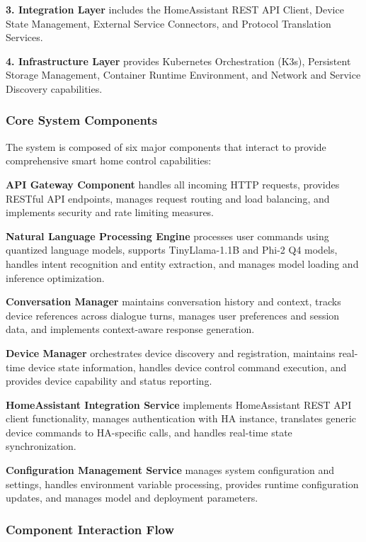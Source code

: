 \documentclass[12pt]{article}
\begin{document}
\textbf{3. Integration Layer} includes the HomeAssistant REST API Client, Device State Management, External Service Connectors, and Protocol Translation Services.

\textbf{4. Infrastructure Layer} provides Kubernetes Orchestration (K3s), Persistent Storage Management, Container Runtime Environment, and Network and Service Discovery capabilities.

\subsubsection{Core System Components}

The system is composed of six major components that interact to provide comprehensive smart home control capabilities:

\textbf{API Gateway Component} handles all incoming HTTP requests, provides RESTful API endpoints, manages request routing and load balancing, and implements security and rate limiting measures.

\textbf{Natural Language Processing Engine} processes user commands using quantized language models, supports TinyLlama-1.1B and Phi-2 Q4 models, handles intent recognition and entity extraction, and manages model loading and inference optimization.

\textbf{Conversation Manager} maintains conversation history and context, tracks device references across dialogue turns, manages user preferences and session data, and implements context-aware response generation.

\textbf{Device Manager} orchestrates device discovery and registration, maintains real-time device state information, handles device control command execution, and provides device capability and status reporting.

\textbf{HomeAssistant Integration Service} implements HomeAssistant REST API client functionality, manages authentication with HA instance, translates generic device commands to HA-specific calls, and handles real-time state synchronization.

\textbf{Configuration Management Service} manages system configuration and settings, handles environment variable processing, provides runtime configuration updates, and manages model and deployment parameters.

\subsubsection{Component Interaction Flow}
\end{document}
